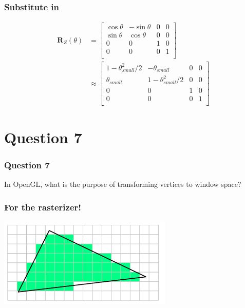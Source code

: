 \documentclass{beamer}
\begin{document}
\begin{frame}
    \frametitle{Substitute in}

    \begin{align*}
    \mathbf{R}_Z(\theta) &= \left[ \begin{matrix}
        \cos\theta & -\sin\theta & 0 & 0 \\
        \sin\theta & \cos\theta & 0 & 0 \\
        0 & 0 & 1 & 0 \\
        0 & 0 & 0 & 1 \\
    \end{matrix} \right] \\
    &\approx \left[ \begin{matrix}
        1 - \theta_{small}^2/2 & -\theta_{small} & 0 & 0 \\
        \theta_{small} & 1 - \theta_{small}^2/2 & 0 & 0 \\
        0 & 0 & 1 & 0 \\
        0 & 0 & 0 & 1 \\
    \end{matrix} \right]
    \end{align*}

\end{frame}

\section{Question 7}

\begin{frame}
    \frametitle{Question 7}

    In OpenGL, what is the purpose of transforming vertices to window space?

\end{frame}

\begin{frame}
    \frametitle{For the rasterizer!}

    \begin{center}
        \includegraphics[scale=0.6]{rasterizer.png}
    \end{center}

\end{frame}
\end{document}
